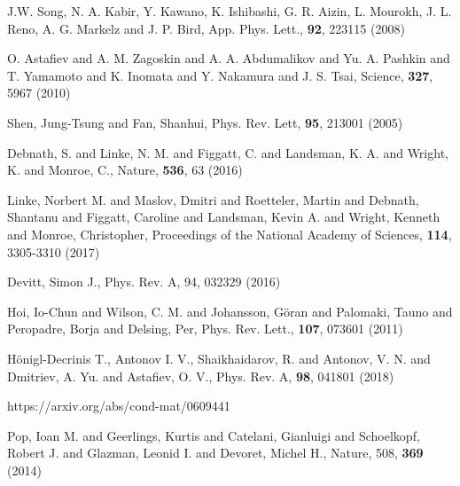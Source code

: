 \begin{thebibliography}{99}
	J.W. Song, N. A. Kabir, Y. Kawano, K. Ishibashi, G. R. Aizin,  L. Mourokh, J. L. Reno, A. G. Markelz and J. P. Bird,  App. Phys. Lett., \textbf{92}, 223115 (2008)
	
	O. Astafiev and A. M. Zagoskin and A. A. Abdumalikov and Yu. A. Pashkin and T. Yamamoto and K. Inomata and Y. Nakamura and J. S. Tsai, Science, \textbf{327}, 5967 (2010)
	
	Shen, Jung-Tsung and Fan, Shanhui, Phys. Rev. Lett, \textbf{95}, 213001 (2005)
	
	Debnath, S. and Linke, N. M. and Figgatt, C. and Landsman, K. A. and Wright, K. and Monroe, C., Nature, \textbf{536}, 63 (2016)
	
	Linke, Norbert M. and Maslov, Dmitri and Roetteler, Martin and Debnath, Shantanu and Figgatt, Caroline and Landsman, Kevin A. and Wright, Kenneth and Monroe, Christopher, Proceedings of the National Academy of Sciences, \textbf{114}, 3305-3310 (2017)
	
	Devitt, Simon J., Phys. Rev. A, {94}, {032329} (2016)
	
	Hoi, Io-Chun and Wilson, C. M. and Johansson, G\"oran and Palomaki, Tauno and Peropadre, Borja and Delsing, Per, Phys. Rev. Lett., \textbf{107}, 073601 (2011)
	
	H\"onigl-Decrinis T., Antonov I. V., Shaikhaidarov, R. and Antonov, V. N. and Dmitriev, A. Yu. and Astafiev, O. V., Phys. Rev. A, \textbf{98}, 041801 (2018)
		
	
	https://arxiv.org/abs/cond-mat/0609441
	
	Pop, Ioan M. and Geerlings, Kurtis and Catelani, Gianluigi and Schoelkopf, Robert J. and Glazman, Leonid I. and Devoret, Michel H., Nature, 508, \textbf{369} (2014)


\end{thebibliography}
